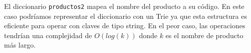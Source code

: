 El diccionario \lstinline{productos2} mapea el nombre del producto a su código. En este caso podríamos representar el diccionario con un Trie ya que esta estructura es eficiente para operar con claves de tipo string. En el peor caso, las operaciones tendrían una complejidad de $O(log(k))$ donde $k$ es el nombre de producto más largo.
